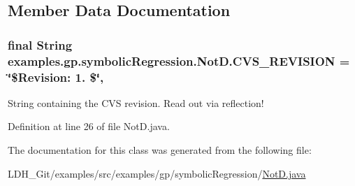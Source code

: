 \subsection{Member Data Documentation}
\hypertarget{classexamples_1_1gp_1_1symbolic_regression_1_1_not_d_a0d36e8cc7b21c513a99a80f6d39e7a90}{
\subsubsection[{C\-V\-S\-\_\-\-R\-E\-V\-I\-S\-I\-O\-N}]{\setlength{\rightskip}{0pt plus 5cm}final String examples.\-gp.\-symbolic\-Regression.\-Not\-D.\-C\-V\-S\-\_\-\-R\-E\-V\-I\-S\-I\-O\-N = \char`\"{}\$Revision\-: 1. \$\char`\"{}\hspace{0.3cm}{\ttfamily [static]}, {\ttfamily [private]}}}\label{classexamples_1_1gp_1_1symbolic_regression_1_1_not_d_a0d36e8cc7b21c513a99a80f6d39e7a90}
String containing the C\-V\-S revision. Read out via reflection! 

Definition at line 26 of file Not\-D.\-java.



The documentation for this class was generated from the following file\-:\begin{DoxyCompactItemize}
\item 
L\-D\-H\-\_\-\-Git/examples/src/examples/gp/symbolic\-Regression/\hyperlink{_not_d_8java}{Not\-D.\-java}\end{DoxyCompactItemize}
